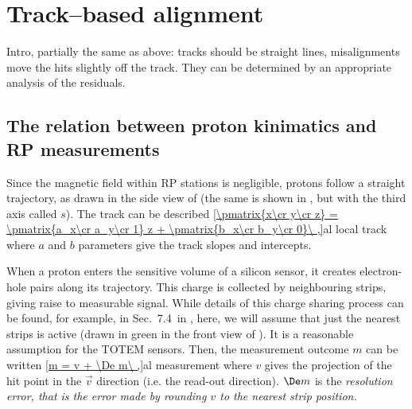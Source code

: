 \section[al tb]{Track--based alignment}

Intro, partially the same as above: tracks should be straight lines, misalignments move the hits slightly off the track. They can be determined by an appropriate analysis of the residuals.


\subsection[al psi]{The relation between proton kinimatics and RP measurements}

Since the magnetic field within RP stations is negligible, protons follow a straight trajectory, as drawn in the side view of  (the same is shown in , but with the third axis called $s$). The track can be described
\eqref{\pmatrix{x\cr y\cr z} = \pmatrix{a_x\cr a_y\cr 1} z + \pmatrix{b_x\cr b_y\cr 0}\ ,}{al local track}
where $a$ and $b$ parameters give the track slopes and intercepts.

When a proton enters the sensitive volume of a silicon sensor, it creates electron-hole pairs along its trajectory. This charge is collected by neighbouring strips, giving raise to measurable signal. While details of this charge sharing process can be found, for example, in Sec.~7.4~in , here, we will assume that just the nearest strips is active (drawn in green in the front view of ). It is a reasonable assumption for the TOTEM sensors. Then, the measurement outcome $m$ can be written
\eqref{m = v + \De m\ ,}{al measurement}
where $v$ gives the projection of the hit point in the $\vec v$ direction (i.e. the read-out direction). $\De m$ is the \em{resolution error}, that is the error made by rounding $v$ to the nearest strip position.


